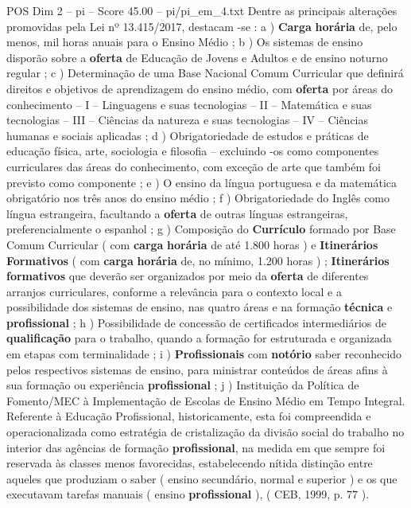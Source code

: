 \begin{textsample}{POS Dim 2 – pi – Score 45.00 – pi/pi\_em\_4.txt}
Dentre as principais alterações promovidas pela Lei nº 13.415/2017, destacam -se : a ) \textbf{Carga} \textbf{horária} de, pelo menos, mil horas anuais para o Ensino Médio ; b ) Os sistemas de ensino disporão sobre a \textbf{oferta} de Educação de Jovens e Adultos e de ensino noturno regular ; c ) Determinação de uma Base Nacional Comum Curricular que definirá direitos e objetivos de aprendizagem do ensino médio, com \textbf{oferta} por áreas do conhecimento – I – Linguagens e suas tecnologias – II – Matemática e suas tecnologias – III – Ciências da natureza e suas tecnologias – IV – Ciências humanas e sociais aplicadas ; d ) Obrigatoriedade de estudos e práticas de educação física, arte, sociologia e filosofia – excluindo -os como componentes curriculares das áreas do conhecimento, com exceção de arte que também foi previsto como componente ; e ) O ensino da língua portuguesa e da matemática obrigatório nos três anos do ensino médio ; f ) Obrigatoriedade do Inglês como língua estrangeira, facultando a \textbf{oferta} de outras línguas estrangeiras, preferencialmente o espanhol ; g ) Composição do \textbf{Currículo} formado por Base Comum Curricular ( com \textbf{carga} \textbf{horária} de até 1.800 horas ) e \textbf{Itinerários} \textbf{Formativos} ( com \textbf{carga} \textbf{horária} de, no mínimo, 1.200 horas ) ; \textbf{Itinerários} \textbf{formativos} que deverão ser organizados por meio da \textbf{oferta} de diferentes arranjos curriculares, conforme a relevância para o contexto local e a possibilidade dos sistemas de ensino, nas quatro áreas e na formação \textbf{técnica} e \textbf{profissional} ; h ) Possibilidade de concessão de certificados intermediários de \textbf{qualificação} para o trabalho, quando a formação for estruturada e organizada em etapas com terminalidade ; i ) \textbf{Profissionais} com \textbf{notório} saber reconhecido pelos respectivos sistemas de ensino, para ministrar conteúdos de áreas afins à sua formação ou experiência \textbf{profissional} ; j ) Instituição da Política de Fomento/MEC à Implementação de Escolas de Ensino Médio em Tempo Integral.
Referente à Educação Profissional, historicamente, esta foi compreendida e operacionalizada como estratégia de cristalização da divisão social do trabalho no interior das agências de formação \textbf{profissional}, na medida em que sempre foi reservada às classes menos favorecidas, estabelecendo nítida distinção entre aqueles que produziam o saber ( ensino secundário, normal e superior ) e os que executavam tarefas manuais ( ensino \textbf{profissional} ), ( CEB, 1999, p. 77 ).

\end{textsample}
